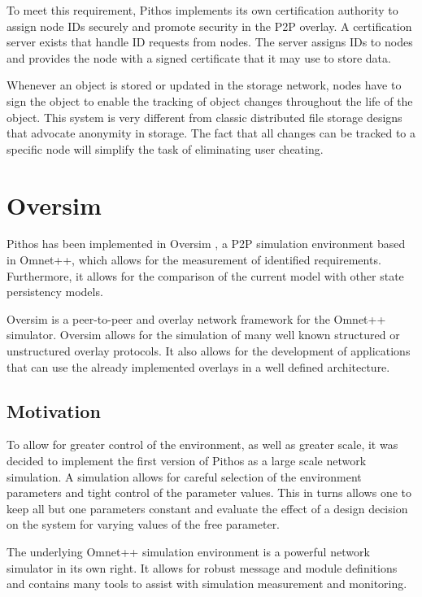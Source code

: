 To meet this requirement, Pithos implements its own certification authority to assign node IDs securely and promote security in the P2P overlay. A
certification server exists that handle ID requests from nodes. The server assigns IDs to nodes and provides the node with a signed certificate that
it may use to store data.

Whenever an object is stored or updated in the storage network, nodes have to sign the object to enable the tracking of object changes throughout the
life of the object. This system is very different from classic distributed file storage designs that advocate anonymity in storage. The fact that all
changes can be tracked to a specific node will simplify the task of eliminating user cheating.

\section{Oversim}

Pithos has been implemented in Oversim \cite{OverSim_2007}, a P2P simulation environment based in Omnet++, which allows for the measurement of identified requirements. Furthermore, it allows for the comparison of the current model with other state persistency models.

Oversim is a peer-to-peer and overlay network framework for the Omnet++ simulator. Oversim allows for the simulation of many well known structured or unstructured overlay protocols. It also allows for the development of applications that can use the already implemented overlays in a well defined architecture.


    \subsection{Motivation}

To allow for greater control of the environment, as well as greater scale, it was decided to implement the first version of Pithos as a large scale network simulation. A simulation allows for careful selection of the environment parameters and tight control of the parameter values. This in turns allows one to keep all but one parameters constant and evaluate the effect of a design decision on the system for varying values of the free parameter.

The underlying Omnet++ simulation environment is a powerful network simulator in its own right. It allows for robust message and module definitions and contains many tools to assist with simulation measurement and monitoring.

